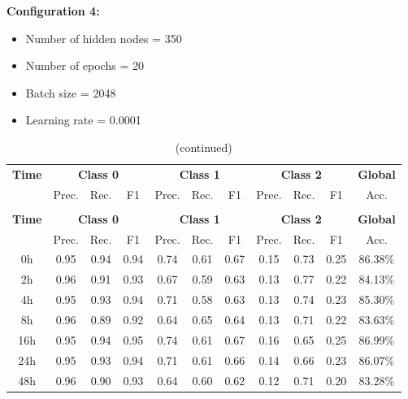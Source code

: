 \documentclass[12pt,oneside]{book} %
\begin{document}
\noindent \textbf{Configuration 4:}
\begin{multicols}{2}
    \begin{itemize}
        \item Number of hidden nodes = 350
        \item Number of epochs = 20
    \end{itemize}
    \begin{itemize}
         \item Batch size = 2048
         \item Learning rate = 0.0001
    \end{itemize}
\end{multicols}

\setlength\LTleft{1cm}
\begin{longtable}{ c ccc ccc ccc c}
\caption{Performance metrics of the LNN model for configuration 4} \\
\toprule
\textbf{Time} & \multicolumn{3}{c}{\textbf{Class 0}} & \multicolumn{3}{c}{\textbf{Class 1}} & \multicolumn{3}{c}{\textbf{Class 2}} & \textbf{Global} \\
               & Prec. & Rec. & F1  & Prec. & Rec. & F1   & Prec. & Rec. & F1  & Acc. \\
\midrule
\endfirsthead

\caption[]{(continued)} \\
\toprule
\textbf{Time} & \multicolumn{3}{c}{\textbf{Class 0}} & \multicolumn{3}{c}{\textbf{Class 1}} & \multicolumn{3}{c}{\textbf{Class 2}} & \textbf{Global} \\
               & Prec. & Rec. & F1  & Prec. & Rec. & F1   & Prec. & Rec. & F1  & Acc. \\
\midrule
\endhead

\bottomrule
\endfoot

\bottomrule
\endlastfoot

0h             & 0.95  & 0.94 & 0.94 & 0.74  & 0.61 & 0.67  & 0.15  & 0.73 & 0.25 & 86.38\% \\
2h             & 0.96  & 0.91 & 0.93 & 0.67  & 0.59 & 0.63  & 0.13  & 0.77 & 0.22 & 84.13\% \\
4h             & 0.95  & 0.93 & 0.94 & 0.71  & 0.58 & 0.63  & 0.13  & 0.74 & 0.23 & 85.30\% \\
8h             & 0.96  & 0.89 & 0.92 & 0.64  & 0.65 & 0.64  & 0.13  & 0.71 & 0.22 & 83.63\% \\
16h            & 0.95  & 0.94 & 0.95 & 0.74  & 0.61 & 0.67  & 0.16  & 0.65 & 0.25 & 86.99\% \\
24h            & 0.95  & 0.93 & 0.94 & 0.71  & 0.61 & 0.66  & 0.14  & 0.66 & 0.23 & 86.07\% \\
48h            & 0.96  & 0.90 & 0.93 & 0.64  & 0.60 & 0.62  & 0.12  & 0.71 & 0.20 & 83.28\% \\
\end{longtable}
\end{document}
